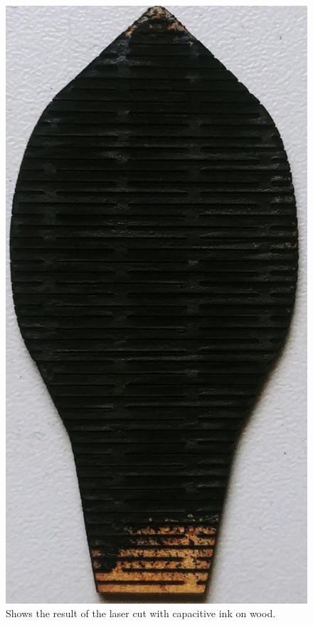 \documentclass[04.3_buildingProcess.tex]{subfiles}
\begin{document}
    \begin{figure}[h!]
        \centering
        \includegraphics[scale=0.05]{images/materialProcess/07_LaserCut.jpg}
        \caption{Shows the result of the laser cut with capacitive ink on wood.}
        \label{fig:07_LaserCut}
    \end{figure}
\end{document}
